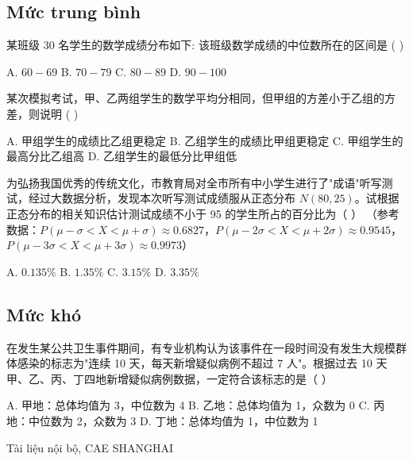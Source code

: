 \documentclass[11pt, a4paper]{article}
\begin{document}
\subsection{Mức trung bình}

\begin{baitap}[7]
某班级 30 名学生的数学成绩分布如下:
该班级数学成绩的中位数所在的区间是 ( )
\par\vspace{3pt}
\noindent A. $60 - 69$ \quad B. $70 - 79$ \quad C. $80 - 89$ \quad D. $90 - 100$
\end{baitap}
\begin{baitap}[8]
某次模拟考试，甲、乙两组学生的数学平均分相同，但甲组的方差小于乙组的方差，则说明 ( )
\par\vspace{3pt}
\noindent A. 甲组学生的成绩比乙组更稳定 \quad B. 乙组学生的成绩比甲组更稳定 \quad C. 甲组学生的最高分比乙组高 \quad D. 乙组学生的最低分比甲组低
\end{baitap}
\begin{baitap}[9]
为弘扬我国优秀的传统文化，市教育局对全市所有中小学生进行了"成语"听写测试，经过大数据分析，发现本次听写测试成绩服从正态分布 $N(80,25)$。试根据正态分布的相关知识估计测试成绩不小于 95 的学生所占的百分比为（ ） （参考数据：$P(\mu-\sigma<X<\mu+\sigma)\approx0.6827$，$P(\mu-2\sigma<X<\mu+2\sigma)\approx0.9545$，$P(\mu-3\sigma<X<\mu+3\sigma)\approx0.9973$）
\par\vspace{3pt}
\noindent A. $0.135\%$ \quad B. $1.35\%$ \quad C. $3.15\%$ \quad D. $3.35\%$
\end{baitap}
\subsection{Mức khó}

\begin{baitap}[10]
在发生某公共卫生事件期间，有专业机构认为该事件在一段时间没有发生大规模群体感染的标志为"连续 10 天，每天新增疑似病例不超过 7 人"。根据过去 10 天甲、乙、丙、丁四地新增疑似病例数据，一定符合该标志的是（ ）
\par\vspace{3pt}
\noindent A. 甲地：总体均值为 3，中位数为 4 \quad B. 乙地：总体均值为 1，众数为 0 \quad C. 丙地：中位数为 2，众数为 3 \quad D. 丁地：总体均值为 1，中位数为 1
\end{baitap}
\vspace{0.8cm}
\begin{center}
{\footnotesize\color{cae_blue} Tài liệu nội bộ, CAE SHANGHAI}
\end{center}
\end{document}
